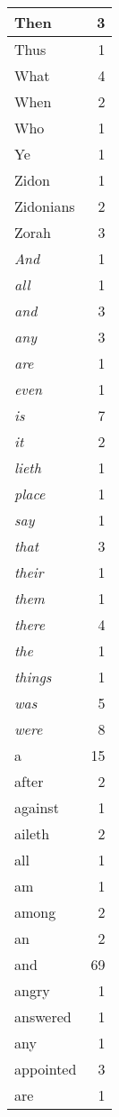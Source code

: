 \begin{center}
\begin{longtable}{l|r}
Then & 3\\ \hline 
Thus & 1\\ \hline 
What & 4\\ \hline 
When & 2\\ \hline 
Who & 1\\ \hline 
Ye & 1\\ \hline 
Zidon & 1\\ \hline 
Zidonians & 2\\ \hline 
Zorah & 3\\ \hline 
\emph{And} & 1\\ \hline 
\emph{all} & 1\\ \hline 
\emph{and} & 3\\ \hline 
\emph{any} & 3\\ \hline 
\emph{are} & 1\\ \hline 
\emph{even} & 1\\ \hline 
\emph{is} & 7\\ \hline 
\emph{it} & 2\\ \hline 
\emph{lieth} & 1\\ \hline 
\emph{place} & 1\\ \hline 
\emph{say} & 1\\ \hline 
\emph{that} & 3\\ \hline 
\emph{their} & 1\\ \hline 
\emph{them} & 1\\ \hline 
\emph{there} & 4\\ \hline 
\emph{the} & 1\\ \hline 
\emph{things} & 1\\ \hline 
\emph{was} & 5\\ \hline 
\emph{were} & 8\\ \hline 
a & 15\\ \hline 
after & 2\\ \hline 
against & 1\\ \hline 
aileth & 2\\ \hline 
all & 1\\ \hline 
am & 1\\ \hline 
among & 2\\ \hline 
an & 2\\ \hline 
and & 69\\ \hline 
angry & 1\\ \hline 
answered & 1\\ \hline 
any & 1\\ \hline 
appointed & 3\\ \hline 
are & 1\\ \hline 

\end{longtable}
\end{center}
